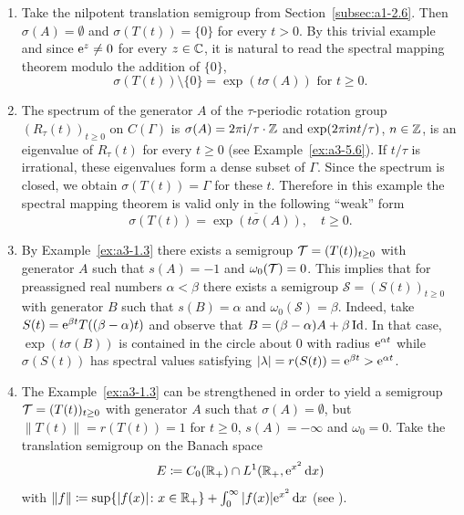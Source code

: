 \begin{example}\label{ex:a3-6.1}%
\begin{enumerate}[\upshape (i), wide, labelindent=.25em]

\item
{}
Take the nilpotent translation semigroup from Section~\ref{subsec:a1-2.6}. Then $\sigma(A) = \emptyset$ and $\sigma(T(t)) = \{0\}$ for every $t > 0$.
By this trivial example and since $\mathrm{e}^{z} \neq 0$ for every $z \in \mathbb{C}$, it is natural to read the spectral mapping theorem modulo the addition of\/ $\{0\}$, \ie 
\[
\sigma(T(t)) \setminus \{0\} = \exp(t\sigma(A))  \text{ for } t \geq 0 .
\]

\item
{}
The spectrum of the generator $A$ of the $\tau$-periodic rotation group $(R_{\tau}(t))_{t \geq 0}$ on $C(\Gamma)$ is $\sigma(A) = 2\pi\mathrm{i} /\tau\cdot\mathbb{Z}$ and $\exp(2\pi\mathrm{i} nt/\tau)$, $n \in \mathbb{Z}$, is an eigenvalue of\/ $R_{\tau}(t)$ for every $t \geq 0$ (see Example~\ref{ex:a3-5.6}).
If\/ $t/\tau$ is irrational, these eigenvalues form a dense subset of\/ $\Gamma$.
Since the spectrum is closed, we obtain $\sigma(T(t)) = \Gamma$ for these $t$.
Therefore in this example the spectral mapping theorem is valid only in the following \enquote{weak} form
\[
\sigma(T(t)) = \overline{\exp(t\sigma(A))}, \quad t \geq 0 .
\]

\item 
By Example~\ref{ex:a3-1.3} there exists a semigroup $\TT = (T(t))_{t \geq 0}$ with generator $A$ such that $s(A) = -1$ and $\omega_{0}(\mathcal{T}) = 0$.
This implies that for preassigned real numbers $\alpha < \beta$ there exists a semigroup $\mathcal{S} = (S(t))_{t \geq 0}$ with generator $B$ such that $s(B) = \alpha$ and $\omega_{0}(\mathcal{S}) = \beta$. Indeed, take $S(t) = \mathrm{e}^{\beta t}T((\beta - \alpha)t)$ and observe that $B = (\beta-\alpha)A + \beta\operatorname{Id}$. 
In that case, $\exp(t\sigma(B))$ is contained in the circle about $0$ with radius $\mathrm{e}^{\alpha t}$ 
while $\sigma(S(t))$ has spectral values satisfying $|\lambda| = r(S(t)) = \mathrm{e}^{\beta t} > \mathrm{e}^{\alpha t}$. 


\item 
The Example~\ref{ex:a3-1.3} can be strengthened in order to yield a semigroup $\TT = (T(t))_{t \geq 0}$ with generator $A$ such that $\sigma(A) = \emptyset$, but $\|T(t)\| = r(T(t)) = 1$ for $t \geq 0$, \ie $s(A) = -\infty$ and $\omega_{0} = 0$. 
Take the translation semigroup on the Banach space
\[
E \coloneq C_{0}(\mathbb{R}_{+}) \cap L^{1}(\mathbb{R}_{+}, \mathrm{e}^{x^{2}}\mathop{}\!\mathrm{d}{x})
\]
with $\|f\| \coloneq \sup \{|f(x)| \colon x \in \mathbb{R}_{+}\} + \int_{0}^{\infty} |f(x)|\mathrm{e}^{x^{2}} \mathop{}\!\mathrm{d}{x}$ (see \textcite{greinervoigtwolff:1981}).


\end{enumerate}
\end{example}
